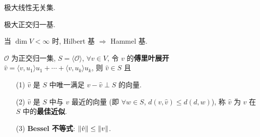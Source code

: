 \documentclass{note}
\begin{document}
\begin{df}[Hammel 基]
    极大线性无关集.
\end{df}

\begin{df}[Hilbert 基]
    极大正交归一基.
\end{df}

\begin{thm}
    当 $\dim V<\infty$ 时, Hilbert 基 $\Longrightarrow$ Hammel 基.
\end{thm}

\begin{eg}
\end{eg}

\begin{thm}[(课本定理 9.11)]
    $\mathcal{O}$ 为正交归一集, $S=\langle\mathcal{O}\rangle$, $\forall v\in V$, 令 $v$ 的\textbf{傅里叶展开} $\hat{v}=\langle v,u_1\rangle u_1+\cdots+\langle v,u_k\rangle u_k$, 则 $\hat{v}\in S$ 且
    \begin{itemize}
        \item[(1)] $\hat{v}$ 是 $S$ 中唯一满足 $v-\hat{v}\perp S$ 的向量.
        \item[(2)] $\hat{v}$ 是 $S$ 中与 $v$ 最近的向量 (即 $\forall w\in S$, $d(v,\hat{v})\leq d(d,w)$), 称 $\hat{v}$ 为 $v$ 在 $S$ 中的\textbf{最佳近似}.
        \item[(3)] \textbf{Bessel 不等式}: $\left\lVert\hat{v}\right\rVert\leq\left\lVert v\right\rVert$.
    \end{itemize}
\end{thm}
\end{document}

